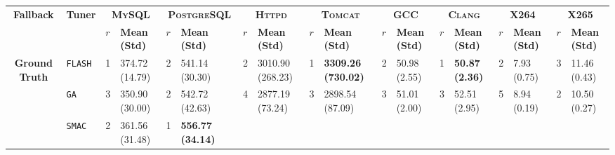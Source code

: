 \begin{tabular}{clllllllllllllllll}
\hline
\multicolumn{1}{c|}{\multirow{2}{*}{\textbf{Fallback}}} &
  \multicolumn{1}{c|}{\multirow{2}{*}{\textbf{Tuner}}} &
  \multicolumn{2}{c|}{\textbf{\textsc{MySQL}}} &
  \multicolumn{2}{c|}{\textbf{\textsc{PostgreSQL}}} &
  \multicolumn{2}{c|}{\textbf{\textsc{Httpd}}} &
  \multicolumn{2}{c|}{\textbf{\textsc{Tomcat}}} &
  \multicolumn{2}{c|}{\textbf{\textsc{GCC}}} &
  \multicolumn{2}{c|}{\textbf{\textsc{Clang}}} &
  \multicolumn{2}{c|}{\textbf{\textsc{X264}}} &
  \multicolumn{2}{c}{\textbf{\textsc{X265}}} \\
\cline{3-18}
\multicolumn{1}{c|}{} &
  \multicolumn{1}{c|}{} &
  \textbf{$r$} &
  \multicolumn{1}{l|}{\textbf{Mean (Std)}} &
  \textbf{$r$} &
  \multicolumn{1}{l|}{\textbf{Mean (Std)}} &
  \textbf{$r$} &
  \multicolumn{1}{l|}{\textbf{Mean (Std)}} &
  \textbf{$r$} &
  \multicolumn{1}{l|}{\textbf{Mean (Std)}} &
  \textbf{$r$} &
  \multicolumn{1}{l|}{\textbf{Mean (Std)}} &
  \textbf{$r$} &
  \multicolumn{1}{l|}{\textbf{Mean (Std)}} &
  \textbf{$r$} &
  \multicolumn{1}{l|}{\textbf{Mean (Std)}} &
  \textbf{$r$} &
  \textbf{Mean (Std)} \\ \hline
\multicolumn{1}{c|}{\multirow{7}{*}{\textbf{Ground Truth}}} &
  \multicolumn{1}{l|}{\texttt{FLASH}} &
  \cellcolor{yellow!25}1 &
  \multicolumn{1}{l|}{\cellcolor{yellow!25}374.72 (14.79)} &
  2 &
  \multicolumn{1}{l|}{541.14 (30.30)} &
  2 &
  \multicolumn{1}{l|}{3010.90 (268.23)} &
  \cellcolor{yellow!25}1 &
  \multicolumn{1}{l|}{\cellcolor{yellow!25}\textbf{3309.26 (730.02)}} &
  2 &
  \multicolumn{1}{l|}{50.98 (2.55)} &
  \cellcolor{yellow!25}1 &
  \multicolumn{1}{l|}{\cellcolor{yellow!25}\textbf{50.87 (2.36)}} &
  2 &
  \multicolumn{1}{l|}{7.93 (0.75)} &
  3 &
  11.46 (0.43) \\
\multicolumn{1}{c|}{} &
  \multicolumn{1}{l|}{\texttt{GA}} &
  3 &
  \multicolumn{1}{l|}{350.90 (30.00)} &
  2 &
  \multicolumn{1}{l|}{542.72 (42.63)} &
  4 &
  \multicolumn{1}{l|}{2877.19 (73.24)} &
  3 &
  \multicolumn{1}{l|}{2898.54 (87.09)} &
  3 &
  \multicolumn{1}{l|}{51.01 (2.00)} &
  3 &
  \multicolumn{1}{l|}{52.51 (2.95)} &
  5 &
  \multicolumn{1}{l|}{8.94 (0.19)} &
  2 &
  10.50 (0.27) \\
\multicolumn{1}{c|}{} &
  \multicolumn{1}{l|}{\texttt{SMAC}} &
  2 &
  \multicolumn{1}{l|}{361.56 (31.48)} &
  \cellcolor{yellow!25}1 &
  \multicolumn{1}{l|}{\cellcolor{yellow!25}\textbf{556.77 (34.14)}} &

\end{tabular}
